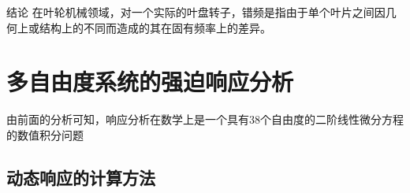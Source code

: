 \begin{mchapter}{结论}
    在叶轮机械领域，对一个实际的叶盘转子，错频是指由于单个叶片之间因几何上或结构上的不同而造成的其在固有频率上的差异。
    \section{多自由度系统的强迫响应分析}
    由前面的分析可知，响应分析在数学上是一个具有38个自由度的二阶线性微分方程的数值积分问题
    \subsection{动态响应的计算方法}
\end{mchapter}